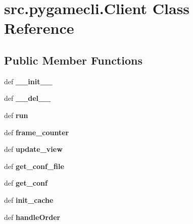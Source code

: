 \hypertarget{classsrc_1_1pygamecli_1_1_client}{\section{src.\-pygamecli.\-Client \-Class \-Reference}
\label{classsrc_1_1pygamecli_1_1_client}
}
\subsection*{\-Public \-Member \-Functions}
\begin{DoxyCompactItemize}
\item 
\hypertarget{classsrc_1_1pygamecli_1_1_client_a5b97e1e6b122fdeaba6d9a9810b4d870}{def {\bfseries \-\_\-\-\_\-init\-\_\-\-\_\-}}\label{classsrc_1_1pygamecli_1_1_client_a5b97e1e6b122fdeaba6d9a9810b4d870}

\item 
\hypertarget{classsrc_1_1pygamecli_1_1_client_a6cf631d834c6a4854133d5509a73b759}{def {\bfseries \-\_\-\-\_\-del\-\_\-\-\_\-}}\label{classsrc_1_1pygamecli_1_1_client_a6cf631d834c6a4854133d5509a73b759}

\item 
\hypertarget{classsrc_1_1pygamecli_1_1_client_a4931c02c572675761050a194ffe441bd}{def {\bfseries run}}\label{classsrc_1_1pygamecli_1_1_client_a4931c02c572675761050a194ffe441bd}

\item 
\hypertarget{classsrc_1_1pygamecli_1_1_client_a0ddec8faec8c0b507d0d21c84a51d571}{def {\bfseries frame\-\_\-counter}}\label{classsrc_1_1pygamecli_1_1_client_a0ddec8faec8c0b507d0d21c84a51d571}

\item 
\hypertarget{classsrc_1_1pygamecli_1_1_client_a1d936b2150a341362934e36fcd49ff35}{def {\bfseries update\-\_\-view}}\label{classsrc_1_1pygamecli_1_1_client_a1d936b2150a341362934e36fcd49ff35}

\item 
\hypertarget{classsrc_1_1pygamecli_1_1_client_a0682f4d50c329a384cb4198480c0379a}{def {\bfseries get\-\_\-conf\-\_\-file}}\label{classsrc_1_1pygamecli_1_1_client_a0682f4d50c329a384cb4198480c0379a}

\item 
\hypertarget{classsrc_1_1pygamecli_1_1_client_af0e8fdbb5dd6cac0bcf296c002cfcf68}{def {\bfseries get\-\_\-conf}}\label{classsrc_1_1pygamecli_1_1_client_af0e8fdbb5dd6cac0bcf296c002cfcf68}

\item 
\hypertarget{classsrc_1_1pygamecli_1_1_client_a6f34226c847c12e62292f9d0567c3d68}{def {\bfseries init\-\_\-cache}}\label{classsrc_1_1pygamecli_1_1_client_a6f34226c847c12e62292f9d0567c3d68}

\item 
\hypertarget{classsrc_1_1pygamecli_1_1_client_a557c91f96f08f4d0125f3ee0340b099e}{def {\bfseries handle\-Order}}\label{classsrc_1_1pygamecli_1_1_client_a557c91f96f08f4d0125f3ee0340b099e}

\end{DoxyCompactItemize}
